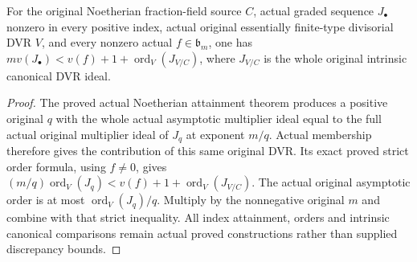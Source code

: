 \begin{theorem}\label{thm:sc0-original-asymptotic-multiplier-divisorial-bound}
\leanok
{}
For the original Noetherian fraction-field source $C$, actual
graded sequence $J_\bullet$ nonzero in every positive index,
actual original essentially finite-type divisorial DVR $V$, and
every nonzero actual $f\in\mathfrak b_m$, one has
$m v(J_\bullet)<v(f)+1+\operatorname{ord}_V(J_{V/C})$,
where $J_{V/C}$ is the whole original intrinsic canonical DVR ideal.
\end{theorem}
\begin{proof}
The proved actual Noetherian attainment theorem produces a positive
original $q$ with the whole actual asymptotic multiplier ideal equal
to the full actual original multiplier ideal of $J_q$ at exponent
$m/q$. Actual membership therefore gives the contribution of this
same original DVR. Its exact proved strict order formula, using
$f\ne0$, gives
$(m/q)\operatorname{ord}_V(J_q)<v(f)+1+\operatorname{ord}_V(J_{V/C})$.
The actual original asymptotic order is at most
$\operatorname{ord}_V(J_q)/q$. Multiply by the nonnegative original
$m$ and combine with that strict inequality. All index attainment,
orders and intrinsic canonical comparisons remain actual proved
constructions rather than supplied discrepancy bounds.
\end{proof}
